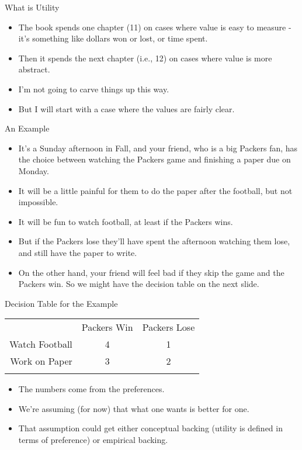 \documentclass[
  ignorenonframetext,
]{beamer}
\providecommand{\tightlist}{%
  \setlength{\itemsep}{0pt}\setlength{\parskip}{0pt}}
\renewcommand{\,}{\text{, }}
\begin{document}
\begin{frame}{What is Utility}
\protect\hypertarget{what-is-utility}{}
\begin{itemize}
\tightlist
\item
  The book spends one chapter (11) on cases where value is easy to
  measure - it's something like dollars won or lost, or time spent.
\item
  Then it spends the next chapter (i.e., 12) on cases where value is
  more abstract.
\item
  I'm not going to carve things up this way.
\item
  But I will start with a case where the values are fairly clear.
\end{itemize}
\end{frame}

\begin{frame}{An Example}
\protect\hypertarget{an-example}{}
\begin{itemize}
\tightlist
\item
  It's a Sunday afternoon in Fall, and your friend, who is a big Packers
  fan, has the choice between watching the Packers game and finishing a
  paper due on Monday.
\item
  It will be a little painful for them to do the paper after the
  football, but not impossible.
\item
  It will be fun to watch football, at least if the Packers wins.
\item
  But if the Packers lose they'll have spent the afternoon watching them
  lose, and still have the paper to write.
\item
  On the other hand, your friend will feel bad if they skip the game and
  the Packers win. So we might have the decision table on the next
  slide.
\end{itemize}
\end{frame}

\begin{frame}{Decision Table for the Example}
\protect\hypertarget{decision-table-for-the-example}{}
\begin{longtable}[]{@{}rcc@{}}
\toprule
& Packers Win & Packers Lose \\ \addlinespace
\midrule
\endhead
Watch Football & 4 & 1 \\ \addlinespace
Work on Paper & 3 & 2 \\ \addlinespace
\bottomrule
\end{longtable}

\begin{itemize}
\tightlist
\item
  The numbers come from the preferences.
\item
  We're assuming (for now) that what one wants is better for one.
\item
  That assumption could get either conceptual backing (utility is
  defined in terms of preference) or empirical backing.
\end{itemize}
\end{frame}
\end{document}
